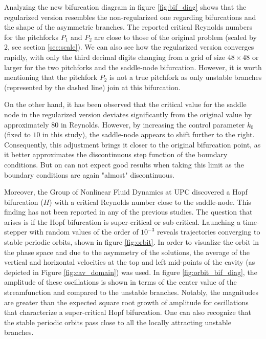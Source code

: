 Analyzing the new bifurcation diagram in figure \ref{fig:bif_diag} shows that
the regularized version resembles the non-regularized one regarding
bifurcations and the shape of the asymmetric branches. The reported critical
Reynolds numbers for the pitchforks $P_1$ and $P_2$ are close to those of the
original problem (scaled by $2$, see section \ref{sec:scale}). We can also see
how the regularized version converges rapidly, with only the third decimal
digits changing from a grid of size $48 \times 48$ or larger for the two
pitchforks and the saddle-node bifurcation. However, it is worth mentioning
that the pitchfork $P_2$ is not a true pitchfork as only unstable branches
(represented by the dashed line) join at this bifurcation.

On the other hand, it has been observed that the critical value for the saddle
node in the regularized version deviates significantly from the original value
by approximately $80$ in Reynolds. However, by increasing the control parameter
$k_0$ (fixed to $10$ in this study), the saddle-node appears to shift further
to the right. Consequently, this adjustment brings it closer to the original
bifurcation point, as it better approximates the discontinuous step function of
the boundary conditions. But on can not expect good results when taking this
limit as the boundary conditions are again "almost" discontinuous.

Moreover, the Group of Nonlinear Fluid Dynamics at UPC discovered a Hopf
bifurcation ($H$) with a critical Reynolds number close to the saddle-node.
This finding has not been reported in any of the previous studies. The question
that arises is if the Hopf bifurcation is super-critical or sub-critical.
Launching a time-stepper with random values of the order of $10^{-3}$ reveals
trajectories converging to stable periodic orbits, shown in figure
\ref{fig:orbit}. In order to visualize the orbit in the phase space and due to
the asymmetry of the solutions, the average of the vertical and horizontal
velocities at the top and left mid-points of the cavity (as depicted in Figure
\ref{fig:cav_domain}) was used. In figure \ref{fig:orbit_bif_diag}, the amplitude of
these oscillations is shown in terms of the center value of the streamfunction
and compared to the unstable branches. Notably, the magnitudes are greater than
the expected square root growth of amplitude for oscillations that characterize
a super-critical Hopf bifurcation. One can also recognize that the stable
periodic orbits pass close to all the locally attracting unstable branches.

